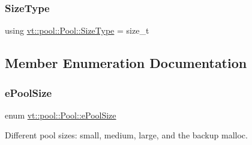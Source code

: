 \subsubsection{\texorpdfstring{Size\+Type}{SizeType}}
{\footnotesize\ttfamily using \hyperlink{structvt_1_1pool_1_1_pool_a4030898e09d0160c24743a7b949c0d46}{vt\+::pool\+::\+Pool\+::\+Size\+Type} =  size\+\_\+t}



\subsection{Member Enumeration Documentation}
\mbox{\label{structvt_1_1pool_1_1_pool_ace8d36439e5e599a8ee68b2f1a6a6b28}} 
\subsubsection{\texorpdfstring{e\+Pool\+Size}{ePoolSize}}
{\footnotesize\ttfamily enum \hyperlink{structvt_1_1pool_1_1_pool_ace8d36439e5e599a8ee68b2f1a6a6b28}{vt\+::pool\+::\+Pool\+::e\+Pool\+Size}\hspace{0.3cm}{\ttfamily [strong]}}



Different pool sizes\+: small, medium, large, and the backup malloc. 

